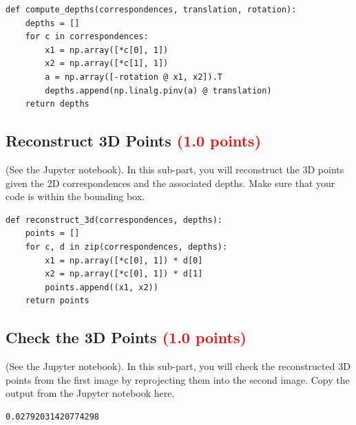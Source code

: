 \documentclass[answers]{exam}
\newcommand{\mypoints}[1]{\textcolor{red}{(#1 points)}}
\begin{document}
\begin{solution}
    \begin{verbatim}
def compute_depths(correspondences, translation, rotation):
    depths = []
    for c in correspondences:
        x1 = np.array([*c[0], 1])
        x2 = np.array([*c[1], 1])
        a = np.array([-rotation @ x1, x2]).T
        depths.append(np.linalg.pinv(a) @ translation)
    return depths
    \end{verbatim}
\end{solution}

\subsection{Reconstruct 3D Points \mypoints{1.0}}
(See the Jupyter notebook). In this sub-part, you will reconstruct the 3D points given the 2D correspondences and the associated depths. Make sure that your code is within the bounding box.

\begin{solution}
    \begin{verbatim}
def reconstruct_3d(correspondences, depths):
    points = []
    for c, d in zip(correspondences, depths):
        x1 = np.array([*c[0], 1]) * d[0]
        x2 = np.array([*c[0], 1]) * d[1]
        points.append((x1, x2))
    return points
    \end{verbatim}
\end{solution}

\subsection{Check the 3D Points \mypoints{1.0}}
(See the Jupyter notebook). In this sub-part, you will check the reconstructed 3D points from the first image by reprojecting them into the second image. Copy the output from the Jupyter notebook here.
\begin{solution}
    \begin{verbatim}
0.02792031420774298
    \end{verbatim}
\end{solution}
\end{document}
